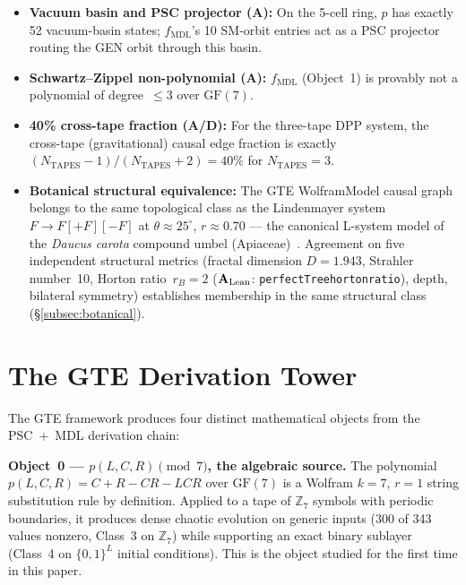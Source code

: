 \documentclass[11pt]{article}
\theoremstyle{remark}
\newcommand{\ZS}{\ensuremath{\mathbb{Z}_7}}
\newcommand{\GF}[1]{\ensuremath{\mathrm{GF}(#1)}}
\newcommand{\lean}[1]{%
  \penalty-100
  \begingroup\def\_{\textunderscore\allowbreak}\texttt{#1}\endgroup}
\newcommand{\fmdl}{\ensuremath{f_{\mathrm{MDL}}}}
\newcommand{\NTAPES}{\ensuremath{N_{\mathrm{TAPES}}}}
\newcommand{\CatA}{\textbf{A}}
\newcommand{\CatAL}{\texorpdfstring{\ensuremath{\textbf{A}_{\rm Lean}}}{A-Lean}}
\newcommand{\CatAD}{\textbf{A/D}}
\begin{document}
\begin{itemize}[leftmargin=2em,itemsep=2pt,topsep=4pt]
        with the composite hub identity
        $E_w(5{\to}1) = E_w(5{\to}0) + E_w(0{\to}1)$, and bump energies
        $(2,3,4)$. The directional asymmetry is the arithmetic trace of the
        $\mathrm{AGL}(1,7)$ chiral $\mathbb{Z}_2$, and the half-integer mean
        $3/2$ of the $0{\leftrightarrow}1$ wall energies is the gap exponent
        of the associated spin-7 chain (§\ref{subsec:wall-spectroscopy}).
  \item \textbf{Vacuum basin and PSC projector (\CatA{}):} On the 5-cell ring,
        $p$ has exactly 52 vacuum-basin states; $\fmdl{}$'s 10 SM-orbit entries
        act as a PSC projector routing the GEN orbit through this basin.
  \item \textbf{Schwartz--Zippel non-polynomial (\CatA{}):} $\fmdl{}$ (Object~1)
        is provably not a polynomial of degree~${\leq}3$ over $\GF{7}$.
  \item \textbf{40\% cross-tape fraction (\CatAD{}):} For the three-tape DPP
        system, the cross-tape (gravitational) causal edge fraction is exactly
        $(\NTAPES{-}1)/(\NTAPES{+}2) = 40\%$ for $\NTAPES = 3$.
  \item \textbf{Botanical structural equivalence:} The GTE WolframModel causal
        graph belongs to the same topological class as the Lindenmayer system
        $F\to F[{+}F][{-}F]$ at $\theta \approx 25^{\circ}$, $r \approx 0.70$ ---
        the canonical L-system model of the \emph{Daucus carota} compound umbel
        (Apiaceae)~\cite{Prusinkiewicz1990,Lindenmayer1968}.
        Agreement on five independent structural metrics (fractal dimension
        $D = 1.943$, Strahler number~10, Horton ratio~$r_B=2$ (\CatAL{}:
        \lean{perfectTree\_horton\_ratio}), depth, bilateral symmetry)
        establishes membership in the same structural class
        (§\ref{subsec:botanical}).
\end{itemize}

\section{The GTE Derivation Tower}
\label{sec:objects}

The GTE framework produces four distinct mathematical objects from the
PSC~+~MDL derivation chain:

\medskip
\noindent\textbf{Object~0 --- $p(L,C,R) \pmod{7}$, the algebraic source.}
The polynomial $p(L,C,R) = C+R-CR-LCR$ over $\GF{7}$ is a Wolfram $k{=}7$,
$r{=}1$ string substitution rule by definition. Applied to a tape of $\ZS$
symbols with periodic boundaries, it produces dense chaotic evolution on
generic inputs (300 of 343 values nonzero, Class~3 on $\ZS$) while supporting
an exact binary sublayer (Class~4 on $\{0,1\}^L$ initial conditions). This
is the object studied for the first time in this paper.
\end{document}
